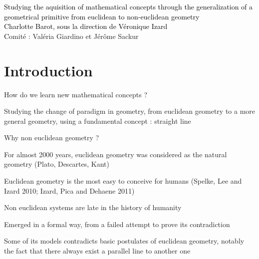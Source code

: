 \documentclass[11pt]{beamer}
\begin{document}
{  {\textcolor{black}{Studying the aquisition of mathematical concepts through the generalization of a geometrical primitive from euclidean to non-euclidean geometry}}\\
  
  {\small {\textcolor{black}{Charlotte Barot, sous la direction de  V\'{e}ronique Izard}}\\
    {\textcolor{black}Comité : Valéria Giardino et Jérôme Sackur }}\\
        
     }

  
        \begin{frame}
          \titlepage
        \end{frame}



        \section{Introduction}

        \begin{frame}

          \centering
          
        How do we learn new mathematical concepts ?

        \end{frame}


        \begin{frame}

          Studying the change of paradigm in geometry, from euclidean geometry to a more general geometry, using a fundamental concept : straight line


        \end{frame}


        

        \begin{frame}
          Why non euclidean geometry ?
                    
          For almost 2000 years, euclidean geometry was considered as the natural geometry (Plato, Descartes, Kant)

          Euclidean geometry is the most easy to conceive for humans (Spelke, Lee and Izard 2010; Izard, Pica and Dehaene 2011)          
          
          Non euclidean systems are late in the history of humanity

          Emerged in a formal way, from a failed attempt to prove its contradiction
          
          Some of its models contradicts basic postulates of euclidean geometry, notably the fact that there always exist a parallel line to another one


        \end{frame}
\end{document}
